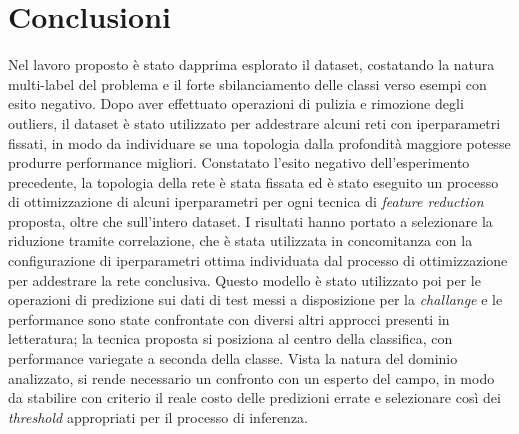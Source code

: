 \section{Conclusioni}
Nel lavoro proposto è stato dapprima esplorato il dataset, costatando la natura multi-label del problema e il forte sbilanciamento delle classi verso esempi con esito negativo. Dopo aver effettuato operazioni di pulizia e rimozione degli outliers, il dataset è stato utilizzato per addestrare alcuni reti con iperparametri fissati, in modo da individuare se una topologia dalla profondità maggiore potesse produrre performance migliori. Constatato l'esito negativo dell'esperimento precedente, la topologia della rete è stata fissata ed è stato eseguito un processo di ottimizzazione di alcuni iperparametri per ogni tecnica di \textit{feature reduction} proposta, oltre che sull'intero dataset. I risultati hanno portato a selezionare la riduzione tramite correlazione, che è stata utilizzata in concomitanza con la configurazione di iperparametri ottima individuata dal processo di ottimizzazione per addestrare la rete conclusiva. Questo modello è stato utilizzato poi per le operazioni di predizione sui dati di test messi a disposizione per la \textit{challange} e le performance sono state confrontate con diversi altri approcci presenti in letteratura; la tecnica proposta si posiziona al centro della classifica, con performance variegate a seconda della classe. Vista la natura del dominio analizzato, si rende necessario un confronto con un esperto del campo, in modo da stabilire con criterio il reale costo delle predizioni errate e selezionare così dei \textit{threshold} appropriati per il processo di inferenza.